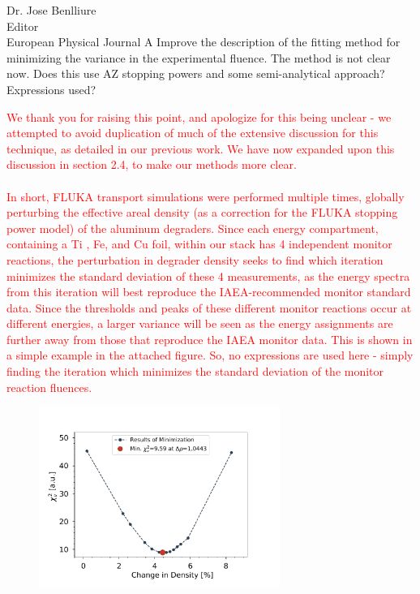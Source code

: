 \documentclass{letter} %
\newcommand{\colornote}[1]{\textcolor{red}{#1}}
\begin{document}
\begin{letter}{Dr. Jose Benlliure \\
Editor \\
European Physical Journal A}
Improve the description of the fitting method for minimizing the variance in the experimental fluence. The method is not clear now. Does this use AZ stopping powers and some semi-analytical approach? Expressions used?

\colornote{We thank you for raising this point, and apologize for this being unclear - we attempted to avoid duplication of much of the extensive discussion for this technique, as detailed in our previous work. We have now expanded upon this discussion in section 2.4, to make our methods more clear.  \\\\In short, FLUKA transport simulations were performed multiple times, globally perturbing the effective areal density (as a correction for the FLUKA stopping power model) of the aluminum degraders. Since each energy compartment, containing a Ti , Fe, and  Cu foil, within our stack has 4 independent monitor reactions, the perturbation in degrader density seeks to find which iteration minimizes the standard deviation of these 4 measurements, as the energy spectra from this iteration will best reproduce the IAEA-recommended monitor standard data. Since the thresholds and peaks of these different monitor reactions occur at different energies, a larger variance will be seen as the energy assignments are further away from those that reproduce the IAEA monitor data.  This is shown in a simple example in the attached figure.  So, no expressions are used here - simply finding the iteration which minimizes the standard deviation of the monitor reaction fluences.}

\begin{figure}
 \centering
 \includegraphics[width=0.7\textwidth]{./minimize_fluka_55.pdf}
\end{figure}


\end{letter}
\end{document}
